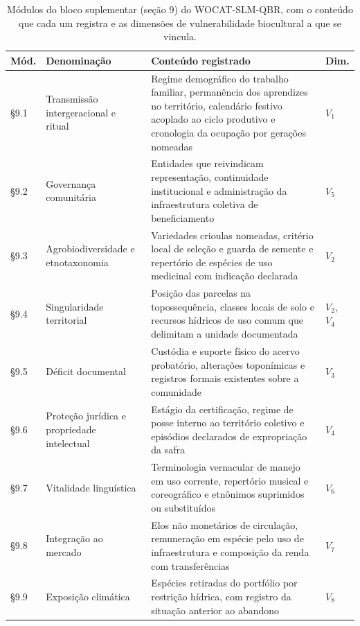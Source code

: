 \documentclass[preprint,authoryear,12pt]{elsarticle}
\newcommand{\fonte}[1]{%
  \par\vspace{2pt}\noindent{\footnotesize Fonte: #1}\par}
\begin{document}
\begin{table}[H]
\centering
\caption{Módulos do bloco suplementar (seção 9) do WOCAT-SLM-QBR, com o conteúdo que cada um registra e as dimensões de vulnerabilidade biocultural a que se vincula.}
\label{tab:modulos_secao9}
\small
\setlength{\tabcolsep}{4pt}
\begin{tabular}{p{0.9cm}p{3.6cm}p{6.6cm}p{1.9cm}}
\toprule
\textbf{Mód.} & \textbf{Denominação} & \textbf{Conteúdo registrado} & \textbf{Dim.} \\
\midrule
§9.1 & Transmissão intergeracional e ritual & Regime demográfico do trabalho familiar, permanência dos aprendizes no território, calendário festivo acoplado ao ciclo produtivo e cronologia da ocupação por gerações nomeadas & $V_1$ \\
\addlinespace
§9.2 & Governança comunitária & Entidades que reivindicam representação, continuidade institucional e administração da infraestrutura coletiva de beneficiamento & $V_5$ \\
\addlinespace
§9.3 & Agrobiodiversidade e etnotaxonomia & Variedades crioulas nomeadas, critério local de seleção e guarda de semente e repertório de espécies de uso medicinal com indicação declarada & $V_2$ \\
\addlinespace
§9.4 & Singularidade territorial & Posição das parcelas na topossequência, classes locais de solo e recursos hídricos de uso comum que delimitam a unidade documentada & $V_2$, $V_4$ \\
\addlinespace
§9.5 & Déficit documental & Custódia e suporte físico do acervo probatório, alterações toponímicas e registros formais existentes sobre a comunidade & $V_3$ \\
\addlinespace
§9.6 & Proteção jurídica e propriedade intelectual & Estágio da certificação, regime de posse interno ao território coletivo e episódios declarados de expropriação da safra & $V_4$ \\
\addlinespace
§9.7 & Vitalidade linguística & Terminologia vernacular de manejo em uso corrente, repertório musical e coreográfico e etnônimos suprimidos ou substituídos & $V_6$ \\
\addlinespace
§9.8 & Integração ao mercado & Elos não monetários de circulação, remuneração em espécie pelo uso de infraestrutura e composição da renda com transferências & $V_7$ \\
\addlinespace
§9.9 & Exposição climática & Espécies retiradas do portfólio por restrição hídrica, com registro da situação anterior ao abandono & $V_8$ \\
\bottomrule
\end{tabular}
\fonte{\textbf{Elaborado pelos autores} (2026).}
\end{table}
\end{document}

